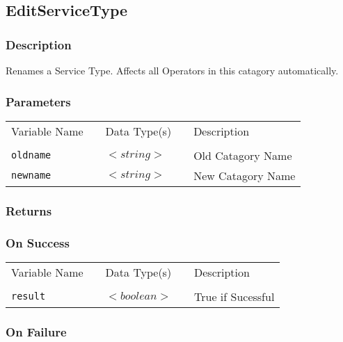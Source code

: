 \subsection{EditServiceType}

\subsubsection{Description}

Renames a Service Type. Affects all Operators in this catagory
automatically. 

\subsubsection{Parameters}

\begin{tabular}{lllll}
Variable Name	&		&	Data Type(s)		&	&	Description	\\
				&	&	&	&	\\
\verb!oldname! & \hspace{15mm} & $<string>$ & \hspace{15mm} & Old Catagory Name \\
\verb!newname! & \hspace{15mm} & $<string>$ & \hspace{15mm} & New Catagory Name \\
\end{tabular}

\subsubsection{Returns}

\subsubsection{On Success}

\begin{tabular}{lllll}
Variable Name	&		&	Data Type(s)		&	&	Description	\\
				&	&	&	&	\\
\verb!result! & \hspace{15mm} & $<boolean>$ & \hspace{15mm} & True if Sucessful \\
\end{tabular}

\subsubsection{On Failure}

